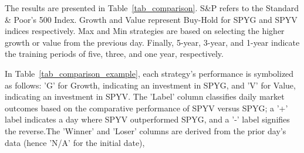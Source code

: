 \documentclass{article}
\begin{document}
The results are presented in Table~\ref{tab_comparison}.
S\&P refers to the Standard \& Poor's 500 Index. Growth and Value represent Buy-Hold for SPYG and SPYV indices respectively.
Max and Min strategies are based on selecting the higher growth or value from the previous day. Finally, 5-year, 3-year, and 1-year indicate the training periods of five, three, and one year, respectively.

In Table~\ref{tab_comparison_example}, each strategy's performance is symbolized as follows: 'G' for Growth, indicating an investment in SPYG, and 'V' for Value, indicating an investment in SPYV. The 'Label' column classifies daily market outcomes based on the comparative performance of SPYV versus SPYG; a '+' label indicates a day where SPYV outperformed SPYG, and a '-' label signifies the reverse.The 'Winner' and 'Loser' columns are derived from the prior day's data (hence 'N/A' for the initial date), 



\begin{comment}
\begin{table}[!ht]
    \centering
    \caption{Strategy Performance Example Against SPYV and SPYG Daily Returns}
    \begin{tabular}{llllllllll}
    \hline
        Date & 12/30/05 & 1/1/00 & 1/2/00 & 1/5/06 & 1/6/06 & 1/9/06 & 1/10/06 & 1/11/06 & 1/12/06 \\ \hline
        SPYV & -0.5\% & 1.6\% & 0.4\% & 0.1\% & 0.9\% & 0.3\% & -0.2\% & 0.5\% & -0.6\% \\ 
        SPYG & -0.5\% & 1.4\% & 0.7\% & -0.1\% & 1.0\% & 0.6\% & 0.0\% & 0.3\% & -0.4\% \\ 
        Label & + & + & - & + & - & - & - & + & - \\ 
        Growth & G & G & G & G & G & G & G & G & G \\ 
        Value & V & V & V & V & V & V & V & V & V \\ 
        Winer & N/A & V & V & G & V & G & G & G & V \\ 
        Loser & N/A & G & G & V & G & V & V & V & G \\ \hline
    \end{tabular}
    \label{tab_comparison_example}
\end{table}
In Table~\ref{tab_pp}, the ‘SPYG>SPYV’ column represents the percentage probability that SPYG's daily returns exceed SPYV's during the observation period.
\end{comment}
\end{document}
